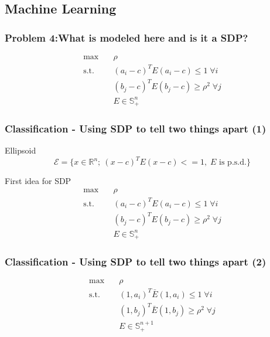 \documentclass[11pt]{beamer}
\begin{document}
	
\subsection{Machine Learning}
\begin{frame}
	\frametitle{Problem 4:\newline What is modeled here and is it a SDP?}
	\begin{block}{\vspace*{-3ex}}
		\begin{equation*}
		\begin{aligned}
		\max\quad& \rho\\
		\text{s.t.}\quad&(a_i-c)^TE(a_i-c)\leq 1\;\forall i\\
		&(b_j-c)^TE(b_j-c)\geq \rho^2\;\forall j\\
		& E\in\mathbb{S}^n_+
		\end{aligned}
		\end{equation*}
	\end{block}
\end{frame}
\begin{frame}
	\frametitle{Classification - Using SDP to tell two things apart (1)}
	\begin{block}{Ellipsoid}
		\begin{equation*}
			\mathcal{E}=\{x\in\mathbb{R}^n;\:(x-c)^TE(x-c)<=1,\;E \text{ is p.s.d.}\}
		\end{equation*}
	\end{block}
	\begin{block}{First idea for SDP}
		\begin{equation*}
		\begin{aligned}
		\max\quad& \rho\\
		\text{s.t.}\quad&(a_i-c)^TE(a_i-c)\leq 1\;\forall i\\
		&(b_j-c)^TE(b_j-c)\geq \rho^2\;\forall j\\
		& E\in\mathbb{S}^n_+
		\end{aligned}
		\end{equation*}
	\end{block}
\end{frame}
\begin{frame}
	\frametitle{Classification - Using SDP to tell two things apart (2)}
	\begin{equation*}
	\begin{aligned}
	\max\quad& \rho\\
	\text{s.t.}\quad&(1,a_i)^T\bar{E}(1,a_i)\leq 1\;\forall i\\
	&(1,b_j)^T\bar{E}(1,b_j)\geq \rho^2\;\forall j\\
	& E\in\mathbb{S}^{n+1}_+
	\end{aligned}
	\end{equation*}
\end{frame}
\end{document}
